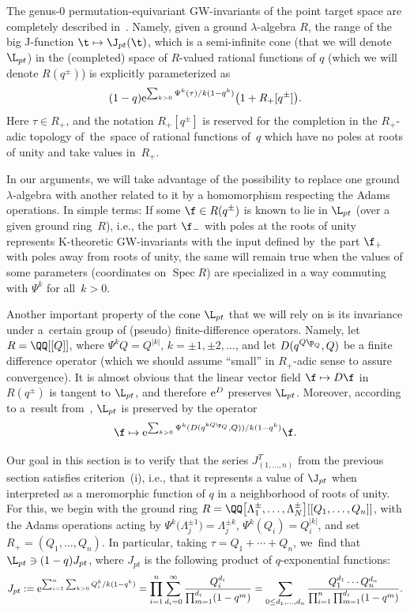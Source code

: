 The genus-$0$ permutation-equivariant GW-invariants of the point target space are completely described in~\cite{Givental:perm3}. Namely, given a ground $\lambda$-algebra $R$, the range of the big J-function
$\t\mapsto \J_{pt}(\t)$, which is a semi-infinite cone (that we will denote $\L_{pt}$) in the (completed) space of $R$-valued rational functions of $q$ (which we will denote $R(q^{\pm})$) is explicitly parameterized as
\[
(1-q) {\rm e}^{ \sum_{k>0}\Psi^k(\tau)/k(1-q^k)}\big(1+R_{+}[q^{\pm}]\big).
\]
Here $\tau\in R_{+}$, and the notation $R_{+}[q^{\pm}]$ is reserved for the completion in the $R_{+}$-adic topology of~the~space of rational functions of~$q$ which have no poles at roots of unity and take values in~$R_{+}$.

In our arguments, we will take advantage of the possibility to replace one ground $\lambda$-algebra with another related to it by a homomorphism respecting the Adams operations. In simple terms: If some
$\f\in R(q^{\pm})$ is known to lie in $\L_{pt}$ (over a given ground ring~$R$), i.e., the part $\f_{-}$ with poles at the roots of unity represents K-theoretic GW-invariants with the input defined by~the part $\f_{+}$ with poles away from roots of unity, the same will remain true when the values of some parameters (coordinates on $\operatorname{Spec} R$) are specialized in a way commuting with $\Psi^k$ for all~$k>0$.

Another important property of the cone $\L_{pt}$ that we will rely on is its invariance under a~cer\-tain group of (pseudo) finite-difference operators. Namely, let $R=\QQ[[Q]]$, where $\Psi^kQ=Q^{|k|}$, $k=\pm 1,\pm 2,\dots$, and let $D(q^{Q\p_Q},Q)$ be a finite difference operator (which we should assume ``small'' in $R_{+}$-adic sense to assure convergence). It is almost obvious that the linear vector field $\f \mapsto D\f$ in $R(q^{\pm})$ is tangent to $\L_{pt}$, and therefore ${\rm e}^D$ preserves $\L_{pt}$. Moreover, according to a~result from~\cite{Givental:perm4}, $\L_{pt}$ is preserved by the operator
\[
\f\mapsto {\rm e}^{ \sum_{k>0} \Psi^k(D(q^{kQ\p_Q},Q))/k(1-q^k)} \f.
\]

Our goal in this section is to verify that the series $J^T_{(1,\dots,n)}$ from the previous section satis\-fies criterion~(i), i.e., that it represents a value of $\J_{pt}$ when interpreted as a meromorphic function of $q$ in a neighborhood of roots of unity. For this, we begin with the ground ring $R=\QQ\big[\Lambda_1^{\pm},\dots,\Lambda_N^{\pm}\big][[Q_1,\dots,Q_n]]$, with the Adams operations acting by $\Psi^k\big(\Lambda_j^{\pm 1}\big)=\Lambda_j^{\pm k}$, $\Psi^k(Q_i)=Q_i^{|k|}$, and set $R_{+}=(Q_1,\dots,Q_n)$. In particular, taking $\tau=Q_1+\cdots+Q_n$, we~find that $\L_{pt}\ni (1-q) J_{pt}$, where $J_{pt}$ is the following product of $q$-exponential functions:
\begin{gather*}
J_{pt}:= {\rm e}^{\sum_{i=1}^n\sum_{k>0}Q_i^k/k(1-q^k)}
= \prod_{i=1}^n \sum_{d_i=0}^{\infty}\frac{Q_i^{d_i}}{\prod_{m=1}^{d_i}(1-q^m)}
 = \sum_{0\leq d_1,\dots,d_n}\frac{Q_1^{d_1}\cdots Q_n^{d_n}}{\prod_{i=1}^n\prod_{m=1}^{d_i}(1-q^m)}.
 \end{gather*}

